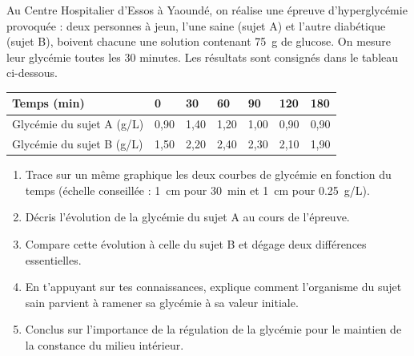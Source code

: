 \documentclass[11pt]{article}
\begin{document}
\begin{exercice}
Au Centre Hospitalier d'Essos à Yaoundé, on réalise une épreuve d'hyperglycémie provoquée : deux personnes à jeun, l'une saine (sujet A) et l'autre diabétique (sujet B), boivent chacune une solution contenant \SI{75}{g} de glucose. On mesure leur glycémie toutes les 30 minutes. Les résultats sont consignés dans le tableau ci-dessous.
\begin{center}
\begin{tabularx}{\linewidth}{|l|X|X|X|X|X|X|}
\hline
\rowcolor{popblueL} \textbf{Temps (min)} & 0 & 30 & 60 & 90 & 120 & 180 \\
\hline
Glycémie du sujet A (g/L) & 0,90 & 1,40 & 1,20 & 1,00 & 0,90 & 0,90 \\
\hline
Glycémie du sujet B (g/L) & 1,50 & 2,20 & 2,40 & 2,30 & 2,10 & 1,90 \\
\hline
\end{tabularx}
\end{center}
\begin{enumerate}
\item Trace sur un même graphique les deux courbes de glycémie en fonction du temps (échelle conseillée : \SI{1}{cm} pour \SI{30}{min} et \SI{1}{cm} pour \SI{0,25}{g/L}).
\item Décris l'évolution de la glycémie du sujet A au cours de l'épreuve.
\item Compare cette évolution à celle du sujet B et dégage deux différences essentielles.
\item En t'appuyant sur tes connaissances, explique comment l'organisme du sujet sain parvient à ramener sa glycémie à sa valeur initiale.
\item Conclus sur l'importance de la régulation de la glycémie pour le maintien de la constance du milieu intérieur.
\end{enumerate}
\end{exercice}
\end{document}
